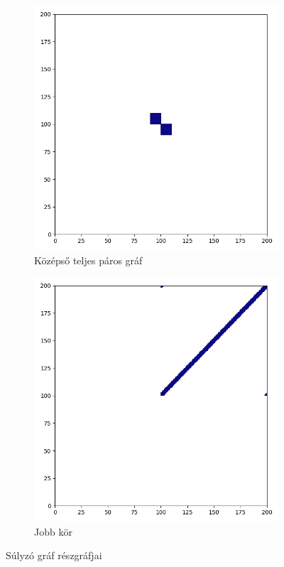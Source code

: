 \begin{figure}[H]
\begin{subfigure}{.3\linewidth}
    \includegraphics[width=\linewidth]{./figures/sulyzo/subgraph_02.jpg}
    \caption{Középső teljes páros gráf}
    \label{fig:sub2}
  \end{subfigure}
  \begin{subfigure}{.3\linewidth}
    \centering
    \includegraphics[width=\linewidth]{./figures/sulyzo/subgraph_01.jpg}
    \caption{Jobb kör}
    \label{fig:sub3}
  \end{subfigure}
  \caption{Súlyzó gráf részgráfjai}
  \label{fig:all}
\end{figure}

